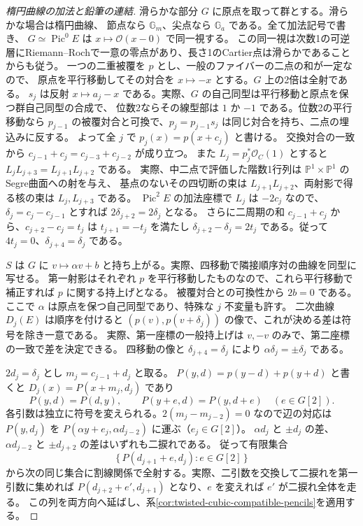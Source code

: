 \begin{proof}[楕円曲線の加法と鉛筆の連結]
滑らかな部分 $G$ に原点を取って群とする。滑らかな場合は楕円曲線、
節点なら $\mathbb G_m$、尖点なら $\mathbb G_a$ である。全て加法記号で書き、
$G\simeq\operatorname{Pic}^0 E$ は $x\mapsto\mathcal O(x-0)$ で同一視する。
この同一視は次数1の可逆層にRiemann--Rochで一意の零点があり、長さ1のCartier点は滑らかであることからも従う。
一つの二重被覆を $p$ とし、一般のファイバーの二点の和が一定なので、
原点を平行移動してその対合を $x\mapsto-x$ とする。$G$ 上の2倍は全射である。
$s_j$ は反射 $x\mapsto a_j-x$ である。実際、$G$ の自己同型は平行移動と原点を保つ群自己同型の合成で、
位数2ならその線型部は $1$ か $-1$ である。位数2の平行移動なら
$p_{j-1}$ の被覆対合と可換で、$p_j=p_{j-1}s_j$ は同じ対合を持ち、二点の埋込みに反する。
よって全 $j$ で $p_j(x)=p(x+c_j)$ と書ける。
交換対合の一致から $c_{j-1}+c_j=c_{j-3}+c_{j-2}$ が成り立つ。
また $L_j=p_j^*\mathcal O_C(1)$ とすると $L_jL_{j+3}=L_{j+1}L_{j+2}$ である。
実際、中二点で評価した階数1行列は $\mathbb P^1\times\mathbb P^1$ のSegre曲面への射を与え、
基点のないその四切断の束は $L_{j+1}L_{j+2}$、両射影で得る核の束は $L_j,L_{j+3}$ である。
$\operatorname{Pic}^2 E$ の加法座標で $L_j$ は $-2c_j$ なので、
$\delta_j=c_j-c_{j-1}$ とすれば $2\delta_{j+2}=2\delta_j$ となる。
さらに二周期の和 $c_{j-1}+c_j$ から、$c_{j+2}-c_j=t_j$ は $t_{j+1}=-t_j$ を満たし
$\delta_{j+2}-\delta_j=2t_j$ である。従って $4t_j=0$、$\delta_{j+4}=\delta_j$ である。

$S$ は $G$ に $v\mapsto \alpha v+b$ と持ち上がる。実際、四移動で隣接順序対の曲線を同型に写せる。
第一射影はそれぞれ $p$ を平行移動したものなので、これら平行移動で補正すれば $p$ に関する持上げとなる。
被覆対合との可換性から $2b=0$ である。
ここで $\alpha$ は原点を保つ自己同型であり、特殊な $j$ 不変量も許す。
二次曲線 $D_j(E)$ は順序を付けると $(p(v),p(v+\delta_j))$ の像で、これが決める差は符号を除き一意である。
実際、第一座標の一般持上げは $v,-v$ のみで、第二座標の一致で差を決定できる。
四移動の像と $\delta_{j+4}=\delta_j$ により $\alpha\delta_j=\pm\delta_j$ である。

$2d_j=\delta_j$ とし $m_j=c_{j-1}+d_j$ と取る。
$P(y,d)=p(y-d)+p(y+d)$ と書くと $D_j(x)=P(x+m_j,d_j)$ であり
\[
 P(y,d)=P(d,y),\qquad P(y+e,d)=P(y,d+e)\quad(e\in G[2]).
\]
各引数は独立に符号を変えられる。$2(m_j-m_{j-2})=0$ なので辺の対応は
$P(y,d_j)$ を $P(\alpha y+e_j,\alpha d_{j-2})$ に運ぶ（$e_j\in G[2]$）。
$\alpha d_j$ と $\pm d_j$ の差、$\alpha d_{j-2}$ と $\pm d_{j+2}$ の差はいずれも二捩れである。
従って有限集合
\[
 \{\,P(d_{j+1}+e,d_j):e\in G[2]\,\}
\]
から次の同じ集合に割線関係で全射する。実際、二引数を交換して二捩れを第一引数に集めれば
$P(d_{j+2}+e',d_{j+1})$ となり、$e$ を変えれば $e'$ が二捩れ全体を走る。
この列を両方向へ延ばし、系\ref{cor:twisted-cubic-compatible-pencils}を適用する。
\end{proof}

